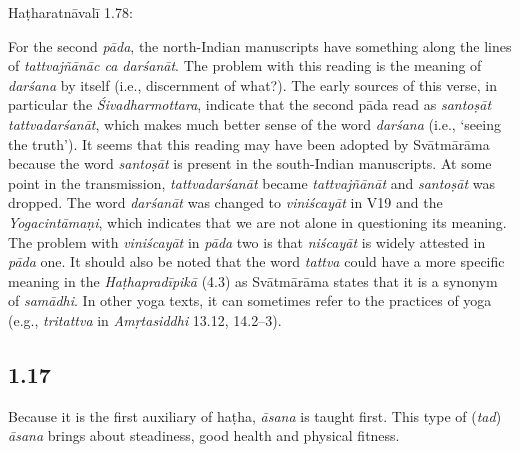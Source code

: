 \begin{ekdosis}
\begin{testimonia}[hp01_016]
Haṭharatnāvalī 1.78:

\begin{versinnote}
\end{versinnote}

\end{testimonia}

\begin{philcomm}[hp01_016]    
For the second \emph{pāda}, the north-Indian manuscripts have something along the lines of \emph{tattvajñānāc ca darśanāt}. The problem with this reading is the meaning of \emph{darśana} by itself (i.e., discernment of what?). The early sources of this verse, in particular the \emph{Śivadharmottara}, indicate that the second pāda read as \emph{santoṣāt tattvadarśanāt}, which makes much better sense of the word \emph{darśana} (i.e., ‘seeing the truth’). It seems that this reading may have been adopted by Svātmārāma because the word \emph{santoṣāt} is present in the south-Indian manuscripts. At some point in the transmission, \emph{tattvadarśanāt} became \emph{tattvajñānāt} and \emph{santoṣāt} was dropped. The word \emph{darśanāt} was changed to \emph{viniścayāt} in V19 and the \emph{Yogacintāmaṇi}, which indicates that we are not alone in questioning its meaning. The problem with \emph{viniścayāt} in \emph{pāda} two is that \emph{niścayāt} is widely attested in \emph{pāda} one. It should also be noted that the word \emph{tattva} could have a more specific meaning in the \emph{Haṭhapradīpikā} (4.3) as Svātmārāma states that it is a synonym of \emph{samādhi}. In other yoga texts, it can sometimes refer to the practices of yoga (e.g., \emph{tritattva} in \emph{Amṛtasiddhi} 13.12, 14.2--3). 
\end{philcomm}

\subsection*{1.17}
\begin{translation}[hp01_017]
Because it is the first auxiliary of haṭha, \emph{āsana} is taught first. This type of (\emph{tad}) \emph{āsana} brings about steadiness, good health and physical fitness.
\end{translation}


\end{ekdosis}
